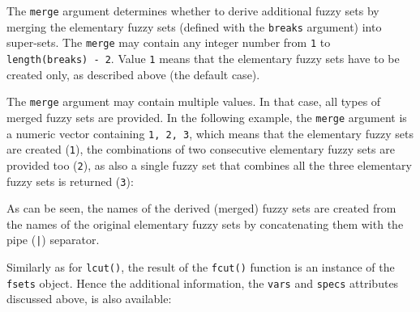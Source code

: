 \documentclass[review]{elsarticle}
\newcommand{\code}[1]{\texttt{#1}}
\begin{document}
The \code{merge} argument determines whether to derive additional fuzzy sets by merging the elementary fuzzy sets (defined with the \code{breaks} argument) into super-sets. The \code{merge} may contain any integer number from \code{1} to \code{length(breaks) - 2}. Value \code{1} means that the elementary fuzzy sets have to be created only, as described above (the default case). 

%

%



The \code{merge} argument may contain multiple values. In that case, all types of merged fuzzy sets are provided. In the following example, the \code{merge} argument is a numeric vector containing \code{1, 2, 3}, which means that the elementary fuzzy sets are created (\code{1}), the combinations of two consecutive elementary fuzzy sets are provided too (\code{2}), as also a single fuzzy set that combines all the three elementary fuzzy sets is returned (\code{3}):
%

%
As can be seen, the names of the derived (merged) fuzzy sets are created from the names of the original elementary fuzzy sets by concatenating them with the pipe (\code{|}) separator. 

Similarly as for \code{lcut()}, the result of the \code{fcut()} function is an instance of the \code{fsets} object. Hence the additional information, the \code{vars} and \code{specs} attributes discussed above, is also available:
%

%







%
%
%


%
%
%
\end{document}
